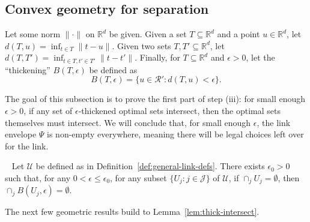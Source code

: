 \documentclass[twoside,11pt]{article}
\newcommand{\reals}{\mathbb{R}}
\newcommand{\R}{\mathcal{R}}
\newcommand{\U}{\mathcal{U}}
\begin{document}
\subsection{Convex geometry for separation}

Let some norm $\|\cdot\|$ on $\reals^d$ be given.
Given a set $T\subseteq\reals^d$ and a point $u\in\reals^d$, let $d(T,u) = \inf_{t \in T} \|t-u\|$.
Given two sets $T,T'\subseteq\reals^d$, let $d(T,T') = \inf_{t\in T, t' \in T'} \|t-t'\|$.
Finally, for $T\subseteq \reals^d$ and $\epsilon > 0$, let the ``thickening'' $B(T,\epsilon)$ be defined as
\[ B(T,\epsilon) = \{u \in \R' : d(T,u) < \epsilon \} . \]


The goal of this subsection is to prove the first part of step (iii): for small enough $\epsilon>0$, if any set of $\epsilon$-thickened optimal sets intersect, then the optimal sets themselves must intersect.
We will conclude that, for small enough $\epsilon$, the link envelope $\Psi$ is non-empty everywhere, meaning there will be legal choices left over for the link.
\begin{lemma}~\label{lem:thick-intersect}
  Let $\U$ be defined as in Definition~\ref{def:general-link-defs}.
  There exists $\epsilon_0 > 0$ such that, for any $0 < \epsilon \leq \epsilon_0$, for any subset $\{U_j : j \in \mathcal{J}\}$ of $\U$, if $\cap_j U_j = \emptyset$, then $\cap_j B(U_j,\epsilon) = \emptyset$.
\end{lemma}

The next few geometric results build to Lemma~\ref{lem:thick-intersect}.
\end{document}
